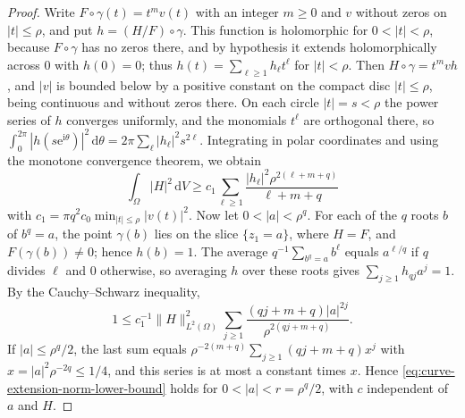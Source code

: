 \begin{proof}
Write $F\circ\gamma(t)=t^mv(t)$ with an integer $m\geq0$ and $v$ without zeros on $|t|\leq\rho$, and put $h=(H/F)\circ\gamma$. This function is holomorphic for $0<|t|<\rho$, because $F\circ\gamma$ has no zeros there, and by hypothesis it extends holomorphically across $0$ with $h(0)=0$; thus $h(t)=\sum_{\ell\geq1}h_\ell t^\ell$ for $|t|<\rho$. Then $H\circ\gamma=t^mvh$, and $|v|$ is bounded below by a positive constant on the compact disc $|t|\leq\rho$, being continuous and without zeros there. On each circle $|t|=s<\rho$ the power series of $h$ converges uniformly, and the monomials $t^\ell$ are orthogonal there, so $\int_0^{2\pi}|h(s\mathrm e^{\mathrm i\theta})|^2\,\mathrm d\theta=2\pi\sum_\ell|h_\ell|^2s^{2\ell}$. Integrating in polar coordinates and using the monotone convergence theorem, we obtain
\[
 \int_\Omega|H|^2\,\mathrm dV
 \geq c_1\sum_{\ell\geq1}
                \frac{|h_\ell|^2\rho^{2(\ell+m+q)}}{\ell+m+q}
\]
with $c_1=\pi q^2c_0\min_{|t|\leq\rho}|v(t)|^2$. Now let $0<|a|<\rho^q$. For each of the $q$ roots $b$ of $b^q=a$, the point $\gamma(b)$ lies on the slice $\{z_1=a\}$, where $H=F$, and $F(\gamma(b))\neq0$; hence $h(b)=1$. The average $q^{-1}\sum_{b^q=a}b^\ell$ equals $a^{\ell/q}$ if $q$ divides $\ell$ and $0$ otherwise, so averaging $h$ over these roots gives $\sum_{j\geq1}h_{qj}a^j=1$. By the Cauchy--Schwarz inequality,
\[
 1\leq c_1^{-1}\|H\|_{L^2(\Omega)}^2
 \sum_{j\geq1}\frac{(qj+m+q)|a|^{2j}}{\rho^{2(qj+m+q)}}.
\]
If $|a|\leq\rho^q/2$, the last sum equals $\rho^{-2(m+q)}\sum_{j\geq1}(qj+m+q)x^j$ with $x=|a|^2\rho^{-2q}\leq1/4$, and this series is at most a constant times $x$. Hence \eqref{eq:curve-extension-norm-lower-bound} holds for $0<|a|<r=\rho^q/2$, with $c$ independent of $a$ and $H$.
\end{proof}

